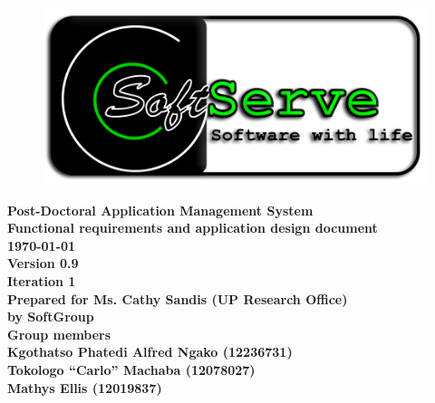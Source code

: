 \documentclass[12pt]{article}
\newcommand{\Title}{Functional requirements and application design document} %
\newcommand{\ssr}{Soft\color{green}{Serve }\color{black}}
\newcommand{\version}{0.9}
\newcommand{\iteration}{1}
\newcommand{\client}{Ms. Cathy Sandis (UP Research Office)}
\newcommand{\project}{Post-Doctoral Application Management System}
\begin{document}
\vspace{4em}

\begin{center}%

\begin{figure}[ht!]
\centering
\includegraphics{../Images_Docs/logo.png}
\end{figure}
\LARGE \bf \project \\[1em]
\LARGE \bf \Title \\[0.25em]
\large \bf \today\\
\bf Version \version\\
\bf Iteration \iteration\\[0.5em]
\Large \bf Prepared for \client\\
\Large \bf by
\Large {\bf \ssr Group }\\[0.5em]
\LARGE {\bf Group members}\\[0.25em]
\large
Kgothatso Phatedi Alfred Ngako (12236731) \\[0.5em]
Tokologo “Carlo” Machaba (12078027) \\[0.5em]
Mathys Ellis (12019837) \\[8em]

\end{center}%

\end{document}
